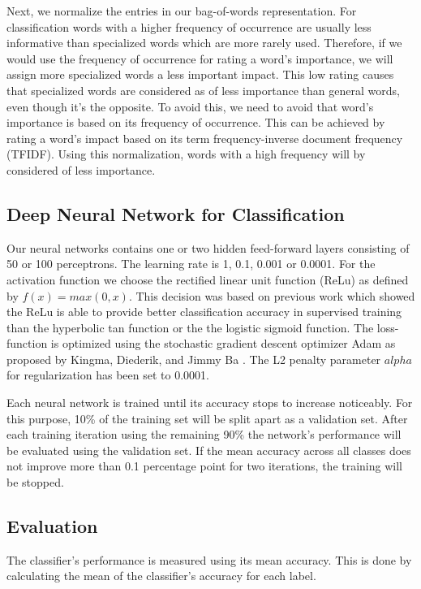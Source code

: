 \documentclass[sigconf]{acmart}
\begin{document}

Next, we normalize the entries in our bag-of-words representation. For classification words with a higher frequency of occurrence are usually less informative than specialized words which are more rarely used. Therefore, if we would use the frequency of occurrence for rating a word's importance, we will assign more specialized words a less important impact. This low rating causes that specialized words are considered as of less importance than general words, even though it's the opposite. To avoid this, we need to avoid that word's importance is based on its frequency of occurrence. This can be achieved by rating a word's impact based on its term frequency-inverse document frequency (TFIDF). Using this normalization, words with a high frequency will by considered of less importance.

\subsection{Deep Neural Network for Classification}

Our neural networks contains one or two hidden feed-forward layers consisting of 50 or 100 perceptrons. The learning rate is 1, 0.1, 0.001 or 0.0001. For the activation function we choose the rectified linear unit function (ReLu) as defined by $f(x) = max(0, x)$. This decision was based on previous work which showed the ReLu is able to provide better classification accuracy in supervised training than the hyperbolic tan function or the the logistic sigmoid function\cite{pmlr-v15-glorot11a}. The loss-function is optimized using the stochastic gradient descent optimizer Adam as proposed by Kingma, Diederik, and Jimmy Ba \cite{adam}. The L2 penalty parameter $alpha$ for regularization has been set to 0.0001.

Each neural network is trained until its accuracy stops to increase noticeably. For this purpose, 10\% of the training set will be split apart as a validation set. After each training iteration using the remaining 90\% the network's performance will be evaluated using the validation set. If the mean accuracy across all classes does not improve more than 0.1 percentage point for two iterations, the training will be stopped. 

\subsection{Evaluation}

The classifier's performance is measured using its mean accuracy. This is done by calculating the mean of the classifier's accuracy for each label.
\end{document}
